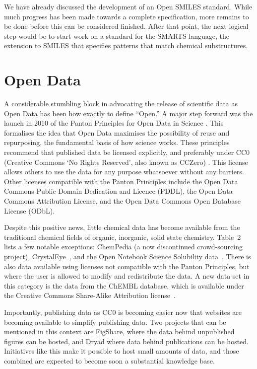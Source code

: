 \documentclass[10pt]{bmc_article}
\newenvironment{bmcformat}{\fussy\setboolean{publ}{true}}{\fussy}
\begin{document}
\begin{bmcformat}
We have already discussed the development of an Open SMILES standard.
While much progress has been made towards a complete specification,
more remains to be done before this can be considered finished. After
that point, the next logical step would be to start work on a standard
for the SMARTS language, the extension to SMILES that specifies
patterns that match chemical substructures.

\section*{Open Data}

A considerable stumbling block in advocating the release of scientific
data as Open Data has been how exactly to define ``Open.'' A major step
forward was the launch in 2010 of the Panton Principles for Open Data
in Science \cite{WebPanton}. This formalises the idea that Open Data maximises the
possibility of reuse and repurposing, the fundamental basis
of how science works. These principles recommend that published data
be licensed explicitly, and preferably under CC0 (Creative Commons `No
Rights Reserved', also known as CCZero) \cite{WebCC0}. This license allows others to use the
data for any purpose whatsoever without any barriers. Other licenses
compatible with the Panton Principles include the
Open Data Commons Public Domain Dedication and Licence (PDDL), the
Open Data Commons Attribution License, and the
Open Data Commons Open Database License (ODbL).\cite{WebOpenData}

Despite this positive news, little chemical data has become
available from the traditional chemical fields of organic,
inorganic, solid state chemistry. Table~2 lists a few notable
exceptions: ChemPedia (a now discontinued crowd-sourcing project),
CrystalEye~\cite{WebCrystalEye},
and the Open Notebook Science Solubility
data~\cite{ONS2010}. There is also data available using licenses
not compatible with the Panton Principles, but where the user
is allowed to modify and redistribute the data. A new data
set in this category is the data from the ChEMBL database,
which is available under the Creative Commons Share-Alike
Attribution license~\cite{Overington2009}.

Importantly, publishing data as CC0 is becoming easier now that
websites are becoming available to simplify publishing data. Two
projects that can be mentioned in this context are
FigShare\cite{WebFigShare}, where the data behind unpublished figures
can be hosted, and Dryad\cite{WebDryad} where data behind publications
can be hosted. Initiatives like this make it possible to host small
amounts of data, and those combined are expected to become soon a
substantial knowledge base. 


\end{bmcformat}
\end{document}
